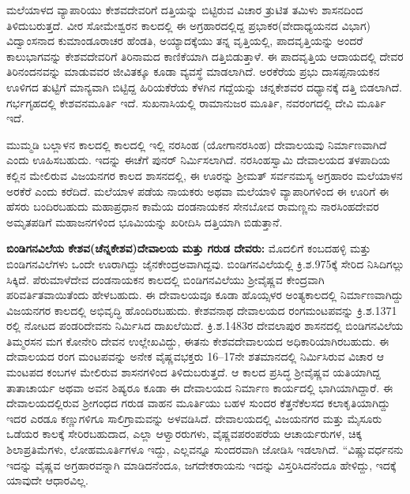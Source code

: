 ಮಲೆಯಾಳದ ವ್ಯಾಪಾರಿಯು ಕೇಶವದೇವರಿಗೆ ದತ್ತಿಯನ್ನು ಬಿಟ್ಟಿರುವ ವಿಚಾರ ತ್ರುಟಿತ ತಮಿಳು ಶಾಸನದಿಂದ ತಿಳಿದುಬರುತ್ತದೆ. ವೀರ ಸೋಮೇಶ್ವರನ ಕಾಲದಲ್ಲಿ ಈ ಅಗ್ರಹಾರದಲ್ಲಿದ್ದ ಪ್ರಭಾಕರ(ವೇದಾಧ್ಯಯನದ ವಿಭಾಗ) ವಿದ್ವಾಂಸನಾದ ಕುಮಾಂಡೂರಾಚರ ಹೆಂಡತಿ, ಅಯ್ಯಾದಕ್ಕೆಯು ತನ್ನ ವೃತ್ತಿಯಲ್ಲಿ, ಪಾದವೃತ್ತಿಯನ್ನು ಅಂದರೆ ಕಾಲುಭಾಗವನ್ನು ಕೇಶವದೇವರಿಗೆ ತಿರಿನಾಮದ ಕಾಣಿಕೆಯಾಗಿ ದತ್ತಿಬಿಡುತ್ತಾಳೆ. ಈ ಪಾದವೃತ್ತಿಯ ಆದಾಯದಲ್ಲಿ ದೇವರ ತಿರಿನಂದನವನ್ನು ಮಾಡುವವರ ಜೀವಿತಕ್ಕೂ ಕೂಡಾ ವ್ಯವಸ್ಥೆ ಮಾಡಲಾಗಿದೆ. ಅರಕೆರೆಯ ಪ್ರಭು ದಾಸಪ್ಪನಾಯಕನ ಊಳಿಗದ ತುಟ್ಟಿಗೆ ಮಾನ್ಯವಾಗಿ ಬಿಟ್ಟಿದ್ದ ಹಿರಿಯಕೆರೆಯ ಕೆಳಗಿನ ಗದ್ದೆಯನ್ನು ಚನ್ನಕೇಶವರ ದಧ್ಯಾನಕ್ಕೆ ದತ್ತಿ ಬಿಡಲಾಗಿದೆ. ಗರ್ಭಗೃಹದಲ್ಲಿ ಕೇಶವನಮೂರ್ತಿ ಇದೆ. ಸುಖನಾಸಿಯಲ್ಲಿ ರಾಮಾನುಜರ ಮೂರ್ತಿ, ನವರಂಗದಲ್ಲಿ ದೇವಿ ಮೂರ್ತಿ ಇದೆ.

ಮುಮ್ಮಡಿ ಬಲ್ಲಾಳನ ಕಾಲದಲ್ಲಿ ಕಾಲದಲ್ಲಿ ಇಲ್ಲಿ ನರಸಿಂಹ (ಯೋಗಾನರಸಿಂಹ) ದೇವಾಲಯವು ನಿರ್ಮಾಣವಾಗಿದೆ ಎಂದು ಊಹಿಸಬಹುದು. ಇದನ್ನು ಈಚೆಗೆ ಪುನರ್​ ನಿರ್ಮಿಸಲಾಗಿದೆ. ನರಸಿಂಹಸ್ವಾಮಿ ದೇವಾಲಯದ ತಳಪಾದಿಯ ಕಲ್ಲಿನ ಮೇಲಿರುವ ವಿಜಯನಗರ ಕಾಲದ ಶಾಸನದಲ್ಲಿ, ಈ ಊರನ್ನು ಶ‍್ರೀಮತ್​ ಸರ್ವನಮಸ್ಯ ಅಗ್ರಹಾರಂ ಮಲೆಯಾಳನ ಅರಕೆರೆ ಎಂದು ಕರೆದಿದೆ. ಮಲೆಯಾಳ ಪಡೆಯ ನಾಯಕರು ಅಥವಾ ಮಲೆಯಾಳಿ ವ್ಯಾಪಾರಿಗಳಿಂದ ಈ ಊರಿಗೆ ಈ ಹೆಸರು ಬಂದಿರಬಹುದು ಮಹಾಪ್ರಧಾನ ಕಾಮೆಯ ದಂಡನಾಯಕನ ಸೇನಬೋವ ರಾಮಣ್ಣನು ನಾರಸಿಂಹದೇವರ ಅಮೃತಪಡಿಗೆ ಮಹಾಜನಗಳಿಂದ ಭೂಮಿಯನ್ನು ಖರೀದಿಸಿ ದತ್ತಿಯಾಗಿ ಬಿಡುತ್ತಾನೆ.

\textbf{ಬಿಂಡಿಗನವಿಲೆಯ ಕೇಶವ(ಚೆನ್ನಕೇಶವ)ದೇವಾಲಯ ಮತ್ತು ಗರುಡ ದೇವರು:} ಮೊದಲಿಗೆ ಕಂಬದಹಳ್ಳಿ ಮತ್ತು ಬಿಂಡಿಗನವಿಲೆಗಳು ಒಂದೇ ಊರಾಗಿದ್ದು ಜೈನಕೇಂದ್ರಅವಾಗಿದ್ದವು. ಬಿಂಡಿಗನವಿಲೆಯಲ್ಲಿ ಕ್ರಿ.ಶ.975ಕ್ಕೆ ಸೇರಿದ ನಿಸಿದಿಗಲ್ಲು ಸಿಕ್ಕಿದೆ. ಪೆರುಮಾಳೆದೇವ ದಂಡನಾಯಕನ ಕಾಲದಲ್ಲಿ ಬಿಂಡಿಗನವಿಲೆಯು ಶ‍್ರೀವೈಷ್ಣವ ಕೇಂದ್ರವಾಗಿ ಪರಿವರ್ತಿತವಾಯಿತೆಂದು ಹೇಳಬಹುದು. ಈ ದೇವಾಲಯವೂ ಕೂಡಾ ಹೊಯ್ಸಳರ ಅಂತ್ಯಕಾಲದಲ್ಲಿ ನಿರ್ಮಾಣವಾಗಿದ್ದು ವಿಜಯನಗರ ಕಾಲದಲ್ಲಿ ಅಭಿವೃದ್ಧಿ ಹೊಂದಿರಬಹುದು. ಕೇಶವನಾಥ ದೇವಾಲಯದ ರಂಗಮಂಟಪವನ್ನು ಕ್ರಿ.ಶ.1371 ರಲ್ಲಿ ನೋಟದ ಪಂಡರಿದೇವನು ನಿರ್ಮಿಸಿದ ದಾಖಲೆಯಿದೆ. ಕ್ರಿ.ಶ.1483ರ ದೇವಲಾಪುರ ಶಾಸನದಲ್ಲಿ ಬಿಂಡಿಗನವಿಲೆಯ ತಿಮ್ಮರಸನ ಮಗ ಕೋನೇರಿ ದೇವನ ಉಲ್ಲೇಖವಿದ್ದು, ಈತನು ಕೇಶವದೇವಾಲಯದ ಅಧಿಕಾರಿಯಾಗಿರಬಹುದು. ಈ ದೇವಾಲಯದ ರಂಗ ಮಂಟಪವನ್ನು ಅನೇಕ ವೈಷ್ಣವಭಕ್ತರು 16–17ನೇ ಶತಮಾನದಲ್ಲಿ ನಿರ್ಮಿಸಿರುವ ವಿಚಾರ ಆ ಮಂಟಪದ ಕಂಬಗಳ ಮೇಲಿರುವ ಶಾಸನಗಳಿಂದ ತಿಳಿದುಬರುತ್ತದೆ. ಆ ಕಾಲದ ಪ್ರಸಿದ್ಧ ಶ‍್ರೀವೈಷ್ಣವ ಯತಿಯಾಗಿದ್ದ ತಾತಾಚಾರ್ಯ ಅಥವಾ ಅವನ ಶಿಷ್ಯರೂ ಕೂಡಾ ಈ ದೇವಾಲಯದ ನಿರ್ಮಾಣ ಕಾರ್ಯದಲ್ಲಿ ಭಾಗಿಯಾಗಿದ್ದಾರೆ. ಈ ದೇವಾಲಯದಲ್ಲಿರುವ ಶ‍್ರೀಗಂಧದ ಗರುಡ ವಾಹನ ಮೂರ್ತಿಯು ಬಹಳ ಸುಂದರ ಕೆತ್ತನೆಕೆಲಸದ ಕಲಾಕೃತಿಯಾಗಿದ್ದು ಇದರ ಎರಡೂ ಕಣ್ಣುಗಳಿಗೂ ಸಾಲಿಗ್ರಾಮವನ್ನು ಅಳವಡಿಸಿದೆ. ದೇವಾಲಯದಲ್ಲಿ ವಿಜಯನಗರ ಮತ್ತು ಮೈಸೂರು ಒಡೆಯರ ಕಾಲಕ್ಕೆ ಸೇರಿರಬಹುದಾದ, ಎಲ್ಲಾ ಆಳ್ವಾರರುಗಳು, ವೈಷ್ಣವಪರಂಪರೆಯ ಆಚಾರ್ಯರುಗಳ, ಚಿಕ್ಕ ಶಿಲಾಪ್ರತಿಮೆಗಳು, ಲೋಹಮೂರ್ತಿಗಳೂ ಇದ್ದು, ಎಲ್ಲವನ್ನೂ ಸುಂದರವಾಗಿ ಜೋಡಿಸಿ ಇಡಲಾಗಿದೆ. “ವಿಷ್ಣುವರ್ಧನನು ಇದನ್ನು ವೈಷ್ಣವ ಅಗ್ರಹಾರವನ್ನಾಗಿ ಮಾಡಿದನೆಂದೂ, ಜಗದೇಕರಾಯನು ಇದನ್ನು ವಿಸ್ತರಿಸಿದನೆಂದೂ ಹೇಳಿದ್ದು, ಇದಕ್ಕೆ ಯಾವುದೇ ಆಧಾರವಿಲ್ಲ.

